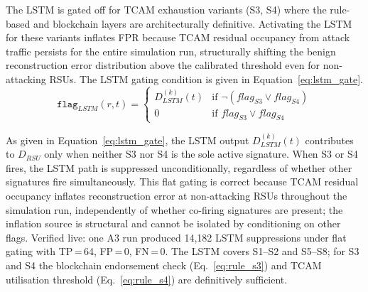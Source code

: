 \documentclass[12pt, a4paper]{report}
\begin{document}
The \ac{LSTM} is gated off for \ac{TCAM} exhaustion
variants (S3, S4) where the rule-based and blockchain
layers are architecturally definitive. Activating the
\ac{LSTM} for these variants inflates \ac{FPR} because
\ac{TCAM} residual occupancy from attack traffic
persists for the entire simulation run, structurally
shifting the benign reconstruction error distribution
above the calibrated threshold even for non-attacking
\ac{RSU}s. The \ac{LSTM} gating condition is given in
Equation~\eqref{eq:lstm_gate}.
\begin{equation}
\texttt{flag}_{LSTM}(r,t) =
\begin{cases}
D_{LSTM}^{(k)}(t) &
\text{if } \neg(flag_{S3} \lor flag_{S4}) \\
0 &
\text{if } flag_{S3} \lor flag_{S4}
\end{cases}
\label{eq:lstm_gate}
\end{equation}

As given in Equation~\eqref{eq:lstm_gate}, the
\ac{LSTM} output $D_{LSTM}^{(k)}(t)$ contributes
to $D_{RSU}$ only when neither S3 nor S4 is the
sole active signature. When S3 or S4 fires, the \ac{LSTM} path is suppressed
unconditionally, regardless of whether other signatures
fire simultaneously. This flat gating is correct because
\ac{TCAM} residual occupancy inflates reconstruction
error at non-attacking \ac{RSU}s throughout the
simulation run, independently of whether co-firing
signatures are present; the inflation source is
structural and cannot be isolated by conditioning on
other flags. Verified live: one A3 run produced
14{,}182 \ac{LSTM} suppressions under flat gating with
TP\,=\,64, FP\,=\,0, FN\,=\,0. The \ac{LSTM}
covers S1--S2 and S5--S8; for S3 and S4 the
blockchain endorsement check
(Eq.~\ref{eq:rule_s3}) and \ac{TCAM} utilisation
threshold (Eq.~\ref{eq:rule_s4}) are definitively
sufficient.
\end{document}
